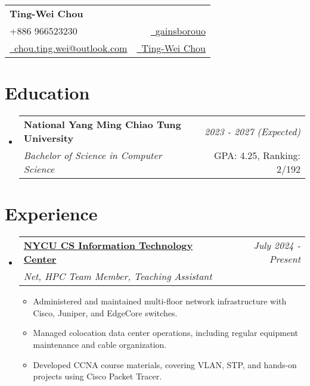\documentclass[a4paper,11pt]{article}
\makeatletter
\newcommand{\resumeSubheading}[4]{
\vspace{0.5mm}\item
    \begin{tabular*}{0.98\textwidth}[t]{l@{\extracolsep{\fill}}r}
        \textbf{#1} & \textit{\footnotesize{#4}} \\
        \textit{\footnotesize{#3}} &  \footnotesize{#2}\\
    \end{tabular*}
    \vspace{-2.4mm}
}
\newcommand{\resumeSubHeadingListStart}{\begin{itemize}[leftmargin=*,labelsep=0mm]}
\newcommand{\resumeItemListStart}{\begin{justify}\begin{itemize}[leftmargin=3ex, rightmargin=2ex, noitemsep,labelsep=1.2mm,itemsep=0mm]\small}
\newcommand{\resumeSubHeadingListEnd}{\end{itemize}\vspace{2mm}}
\newcommand{\resumeItemListEnd}{\end{itemize}\end{justify}\vspace{-2mm}}
\newcommand{\name}{Ting-Wei Chou} %
\newcommand{\phone}{966523230}
\newcommand{\emaila}{chou.ting.wei@outlook.com}
\makeatother
\begin{document}
\selectfont


\parbox{\dimexpr\linewidth-0.3cm\relax}{
\begin{tabularx}{\linewidth}{L r} \\
  \textbf{\Large \name} \\ 
  {\raisebox{0em}{\footnotesize \faPhone} +886 \phone} & \href{https://github.com/gainsborouo}{\raisebox{0.0\height}{\footnotesize \faGithub}\ {gainsborouo}}\\
  \href{mailto:\emaila}{\raisebox{0.0\height}{\footnotesize 
 \faEnvelope}\ {\emaila}}&\href{https://www.linkedin.com/in/userwei}{\raisebox{0.0\height}{\footnotesize \faLinkedin}\ {Ting-Wei Chou}}
\end{tabularx}
}

\section{\textbf{Education}}
  \resumeSubHeadingListStart
    \resumeSubheading
      {National Yang Ming Chiao Tung University}{GPA: 4.25, Ranking: 2/192}
      {Bachelor of Science in Computer Science}{2023 - 2027 (Expected)}
  \resumeSubHeadingListEnd
\vspace{-5.5mm}
%



\section{\textbf{Experience}}
  \resumeSubHeadingListStart
    \resumeSubheading
      {\href{https://www.linkedin.com/company/nycu-csit/}{NYCU CS Information Technology Center}}{}
      {Net, HPC Team Member, Teaching Assistant}{July 2024 - Present}
      \vspace{-2.0mm}
      \resumeItemListStart
        \item {Administered and maintained multi-floor network infrastructure with Cisco, Juniper, and EdgeCore switches.}
        \item {Managed colocation data center operations, including regular equipment maintenance and cable organization.}
        \item {Developed CCNA course materials, covering VLAN, STP, and hands-on projects using Cisco Packet Tracer.}
      \resumeItemListEnd
  \resumeSubHeadingListEnd
\vspace{-8.5mm}
\end{document}
